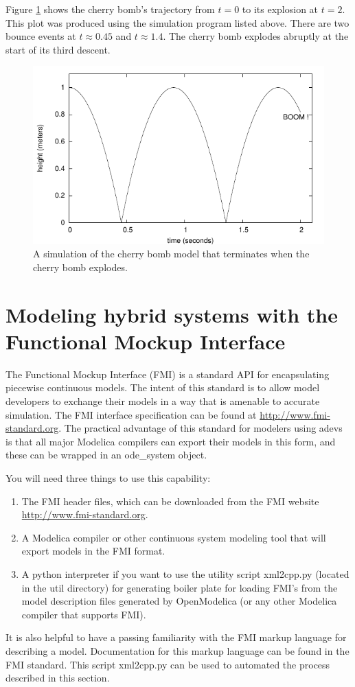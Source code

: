 Figure \ref{fig:cherry_bomb_trajectory} shows the cherry bomb's trajectory from $t=0$ to its explosion at $t=2$. This plot was produced using the simulation program listed above. There are two bounce events at $t \approx 0.45$ and $t \approx 1.4$. The cherry bomb explodes abruptly at the start of its third descent.
\begin{figure}[ht]
\centering
\includegraphics{cont_models_figs/ball_height.pdf}
\caption{A simulation of the cherry bomb model that terminates when the cherry bomb explodes.}
\label{fig:cherry_bomb_trajectory}
\end{figure}

\section{Modeling hybrid systems with the Functional Mockup Interface}
\label{sect:fmi}
The Functional Mockup Interface (FMI) is a standard API for encapsulating piecewise continuous models. The intent of this standard is to allow model developers to exchange their models in a way that is amenable to accurate simulation. The FMI interface specification can be found at \url{http://www.fmi-standard.org}. The practical advantage of this standard for modelers using adevs is that all major Modelica compilers can export their models in this form, and these can be wrapped in an ode\_system object.

You will need three things to use this capability:
\begin{enumerate}
\item The FMI header files, which can be downloaded from the FMI website \url{http://www.fmi-standard.org}.
\item A Modelica compiler or other continuous system modeling tool that will export models in the FMI format.
\item A python interpreter if you want to use the utility script xml2cpp.py (located in the util directory) for generating boiler plate for loading FMI's from the model description files generated by OpenModelica (or any other Modelica compiler that supports FMI).
\end{enumerate}
It is also helpful to have a passing familiarity with the FMI markup language for describing a model. Documentation for this markup language can be found in the FMI standard. This script xml2cpp.py can be used to automated the process described in this section.

